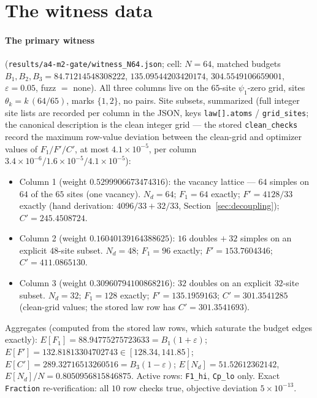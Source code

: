 \documentclass[11pt]{article}
\theoremstyle{plain}
\theoremstyle{definition}
\theoremstyle{remark}
\newcommand{\Nd}{N_{d}}
\begin{document}
\appendix

\section{The witness data}
\label{app:witness}

\paragraph{The primary witness}
(\texttt{results/a4-m2-gate/}\allowbreak\texttt{witness\_N64.json}; cell: $N = 64$, matched budgets
$B_1, B_2, B_3 = 84.71214548308222$, $135.09544203420174$,
$304.5549106659001$, $\varepsilon = 0.05$, fuzz $=$ none). All three columns live
on the $65$-site $\psi_1$-zero grid, sites $\theta_k = k\,(64/65)$, marks
$\{1, 2\}$, no pairs. Site subsets, summarized (full integer site lists are
recorded per column in the JSON, keys \texttt{law[].atoms} /
\texttt{grid\_sites}; the canonical description is the clean integer grid --- the
stored \texttt{clean\_checks} record the maximum row-value deviation between the
clean-grid and optimizer values of $F_1/F'/C'$, at most $4.1 \times 10^{-5}$, per
column $3.4 \times 10^{-6} / 1.6 \times 10^{-5} / 4.1 \times 10^{-5}$):

\begin{itemize}
\item Column 1 (weight $0.5299906673474316$): the vacancy lattice --- $64$
  simples on $64$ of the $65$ sites (one vacancy). $\Nd = 64$; $F_1 = 64$
  exactly; $F' = 4128/33$ exactly (hand derivation: $4096/33 + 32/33$,
  Section~\ref{sec:decoupling}); $C' = 245.4508724$.
\item Column 2 (weight $0.16040139164388625$): $16$ doubles $+\ 32$ simples on
  an explicit $48$-site subset. $\Nd = 48$; $F_1 = 96$ exactly;
  $F' = 153.7604346$; $C' = 411.0865130$.
\item Column 3 (weight $0.30960794100868216$): $32$ doubles on an explicit
  $32$-site subset. $\Nd = 32$; $F_1 = 128$ exactly; $F' = 135.1959163$;
  $C' = 301.3541285$ (clean-grid values; the stored law row has
  $C' = 301.3541693$).
\end{itemize}

Aggregates (computed from the stored law rows, which saturate the budget edges
exactly): $E[F_1] = 88.94775275723633 = B_1(1 + \varepsilon)$;
$E[F'] = 132.81813304702743 \in [128.34, 141.85]$;
$E[C'] = 289.32716513260516 = B_3(1 - \varepsilon)$; $E[\Nd] = 51.52612362142$,
$E[\Nd]/N = 0.8050956815846875$. Active rows: \texttt{F1\_hi},
\texttt{Cp\_lo} only. Exact \texttt{Fraction} re-verification: all $10$ row checks
true, objective deviation $5 \times 10^{-13}$.
\end{document}
